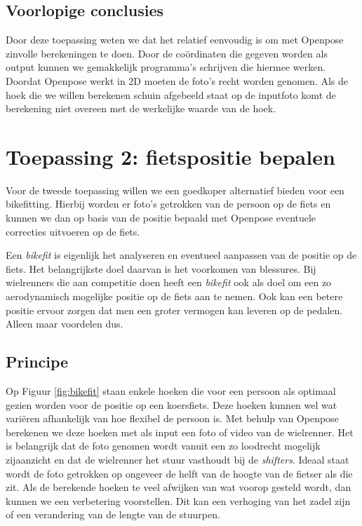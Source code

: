 \documentclass[a4paper,twoside,kulak]{kulakreport}
\begin{document}
\subsection{Voorlopige conclusies}
Door deze  toepassing weten we dat het relatief eenvoudig is om met Openpose zinvolle berekeningen te doen. Door de coördinaten die gegeven worden als output kunnen we gemakkelijk programma's schrijven die hiermee werken. Doordat Openpose werkt in 2D moeten de foto's recht worden genomen. Als de hoek die we willen berekenen schuin afgebeeld staat op de inputfoto komt de berekening niet overeen met de werkelijke waarde van de hoek.


\section{Toepassing 2: fietspositie bepalen}
Voor de tweede toepassing willen we een goedkoper alternatief bieden voor een bikefitting. Hierbij worden er foto's getrokken van de persoon op de fiets en kunnen we dan op basis van de positie bepaald met Openpose eventuele correcties uitvoeren op de fiets.

Een \emph{bikefit} is eigenlijk het analyseren en eventueel aanpassen van de positie op de fiets. Het belangrijkste doel daarvan is het voorkomen van blessures. Bij wielrenners die aan competitie doen heeft een \emph{bikefit} ook als doel om een zo aerodynamisch mogelijke positie op de fiets aan te nemen. Ook kan een betere positie ervoor zorgen dat men een groter vermogen kan leveren op de pedalen. Alleen maar voordelen dus.

\subsection{Principe}

Op Figuur \ref{fig:bikefit} staan enkele hoeken die voor een persoon als optimaal gezien worden voor de positie op een koersfiets. Deze hoeken kunnen wel wat variëren afhankelijk van hoe flexibel de persoon is. Met behulp van Openpose berekenen we deze hoeken met als input een foto of video van de wielrenner. Het is belangrijk dat de foto genomen wordt vanuit een zo loodrecht mogelijk zijaanzicht en dat de wielrenner het stuur vasthoudt bij de \emph{shifters}. Ideaal staat wordt de foto getrokken op ongeveer de helft van de hoogte van de fietser als die zit. Als de berekende hoeken te veel afwijken van wat voorop gesteld wordt, dan kunnen we een verbetering voorstellen. Dit kan een verhoging van het zadel zijn of een verandering van de lengte van de stuurpen.
\end{document}
